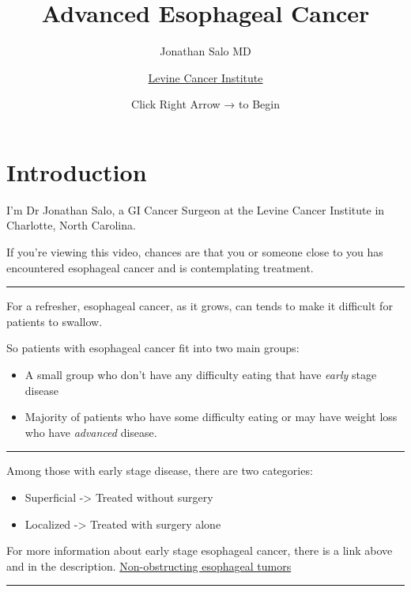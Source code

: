 \documentclass[
]{article}
\title{Advanced Esophageal Cancer}
\subtitle{Jonathan Salo MD}
\author{\href{https://atriumhealth.org/medical-services/specialty-care/cancer-care/esophageal-cancer/meet-the-team\#}{Levine
Cancer Institute}}
\date{Click Right Arrow → to Begin}
\providecommand{\tightlist}{%
  \setlength{\itemsep}{0pt}\setlength{\parskip}{0pt}}
\begin{document}
\maketitle

\hypertarget{introduction}{%
\section{Introduction}\label{introduction}}

I'm Dr Jonathan Salo, a GI Cancer Surgeon at the Levine Cancer Institute
in Charlotte, North Carolina.

If you're viewing this video, chances are that you or someone close to
you has encountered esophageal cancer and is contemplating treatment.

\begin{center}\rule{0.5\linewidth}{0.5pt}\end{center}

For a refresher, esophageal cancer, as it grows, can tends to make it
difficult for patients to swallow.

So patients with esophageal cancer fit into two main groups:

\begin{itemize}
\tightlist
\item
  A small group who don't have any difficulty eating that have
  \emph{early} stage disease
\item
  Majority of patients who have some difficulty eating or may have
  weight loss who have \emph{advanced} disease.
\end{itemize}

\begin{center}\rule{0.5\linewidth}{0.5pt}\end{center}

Among those with early stage disease, there are two categories:

\begin{itemize}
\tightlist
\item
  Superficial -\textgreater{} Treated without surgery
\item
  Localized -\textgreater{} Treated with surgery alone
\end{itemize}

For more information about early stage esophageal cancer, there is a
link above and in the description.
\href{06-Eso_Early.html}{Non-obstructing esophageal tumors}

\begin{center}\rule{0.5\linewidth}{0.5pt}\end{center}
\end{document}
